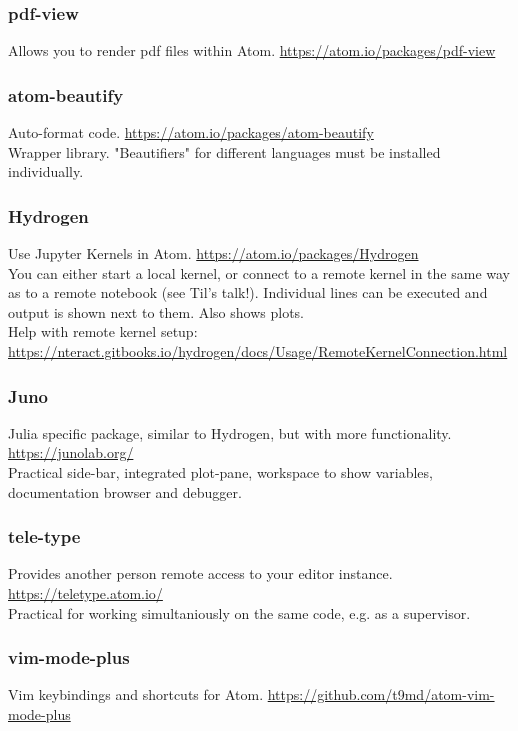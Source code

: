 \documentclass[10pt,a4paper]{article}
\begin{document}
\subsubsection{pdf-view}
Allows you to render pdf files within Atom. \url{https://atom.io/packages/pdf-view}

\subsubsection{atom-beautify}
Auto-format code. \url{https://atom.io/packages/atom-beautify}\\
Wrapper library. "Beautifiers" for different languages must be installed individually.

\subsubsection{Hydrogen}
Use Jupyter Kernels in Atom. \url{https://atom.io/packages/Hydrogen}\\
You can either start a local kernel, or connect to a remote kernel in the same way as to a remote notebook (see Til's talk!).
Individual lines can be executed and output is shown next to them. Also shows plots.\\
Help with remote kernel setup: \url{https://nteract.gitbooks.io/hydrogen/docs/Usage/RemoteKernelConnection.html}

\subsubsection{Juno}
Julia specific package, similar to Hydrogen, but with more functionality. \url{https://junolab.org/}\\
Practical side-bar, integrated plot-pane, workspace to show variables, documentation browser and debugger.

\subsubsection{tele-type}
Provides another person remote access to your editor instance. \url{https://teletype.atom.io/}\\
Practical for working simultaniously on the same code, e.g. as a supervisor.

\subsubsection{vim-mode-plus}
Vim keybindings and shortcuts for Atom. \url{https://github.com/t9md/atom-vim-mode-plus}
\end{document}
